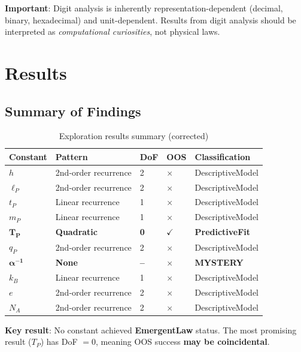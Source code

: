 \documentclass[twocolumn,showpacs,preprintnumbers,amsmath,amssymb,prl]{revtex4-2}
\begin{document}
\textbf{Important}: Digit analysis is inherently representation-dependent (decimal, binary, hexadecimal) and unit-dependent. Results from digit analysis should be interpreted as \textit{computational curiosities}, not physical laws.

\section{Results}

\subsection{Summary of Findings}

\begin{table}[h]
\centering
\caption{Exploration results summary (corrected)}
\label{tab:results}
\begin{tabular}{@{}lllll@{}}
\toprule
Constant & Pattern & DoF & OOS & Classification \\
\midrule
$h$ & 2nd-order recurrence & 2 & $\times$ & DescriptiveModel \\
$\ell_P$ & 2nd-order recurrence & 2 & $\times$ & DescriptiveModel \\
$t_P$ & Linear recurrence & 1 & $\times$ & DescriptiveModel \\
$m_P$ & Linear recurrence & 1 & $\times$ & DescriptiveModel \\
$\mathbf{T_P}$ & \textbf{Quadratic} & \textbf{0} & $\checkmark$ & \textbf{PredictiveFit} \\
$q_P$ & 2nd-order recurrence & 2 & $\times$ & DescriptiveModel \\
$\mathbf{\alpha^{-1}}$ & \textbf{None} & \textbf{--} & $\times$ & \textbf{MYSTERY} \\
$k_B$ & Linear recurrence & 1 & $\times$ & DescriptiveModel \\
$e$ & 2nd-order recurrence & 2 & $\times$ & DescriptiveModel \\
$N_A$ & 2nd-order recurrence & 2 & $\times$ & DescriptiveModel \\
\bottomrule
\end{tabular}
\end{table}

\textbf{Key result}: No constant achieved \textbf{EmergentLaw} status. The most promising result ($T_P$) has DoF $= 0$, meaning OOS success \textbf{may be coincidental}.
\end{document}
